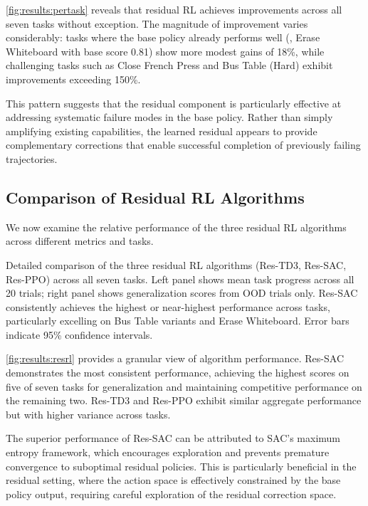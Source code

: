 \autoref{fig:results:pertask} reveals that residual \ac{RL} achieves improvements across all seven tasks without exception. The magnitude of improvement varies considerably: tasks where the base policy already performs well (\eg, Erase Whiteboard with base score 0.81) show more modest gains of 18\%, while challenging tasks such as Close French Press and Bus Table (Hard) exhibit improvements exceeding 150\%.

This pattern suggests that the residual component is particularly effective at addressing systematic failure modes in the base policy. Rather than simply amplifying existing capabilities, the learned residual appears to provide complementary corrections that enable successful completion of previously failing trajectories.

\subsection{Comparison of Residual RL Algorithms}
\label{sec:results:algorithms}

We now examine the relative performance of the three residual \ac{RL} algorithms across different metrics and tasks.

{Detailed comparison of the three residual \ac{RL} algorithms (Res-TD3, Res-SAC, Res-PPO) across all seven tasks. Left panel shows mean task progress across all 20 trials; right panel shows generalization scores from \ac{OOD} trials only. Res-SAC consistently achieves the highest or near-highest performance across tasks, particularly excelling on Bus Table variants and Erase Whiteboard. Error bars indicate 95\% confidence intervals.}

\autoref{fig:results:resrl} provides a granular view of algorithm performance. Res-SAC demonstrates the most consistent performance, achieving the highest scores on five of seven tasks for generalization and maintaining competitive performance on the remaining two. Res-TD3 and Res-PPO exhibit similar aggregate performance but with higher variance across tasks.

The superior performance of Res-SAC can be attributed to SAC's maximum entropy framework, which encourages exploration and prevents premature convergence to suboptimal residual policies. This is particularly beneficial in the residual setting, where the action space is effectively constrained by the base policy output, requiring careful exploration of the residual correction space.

